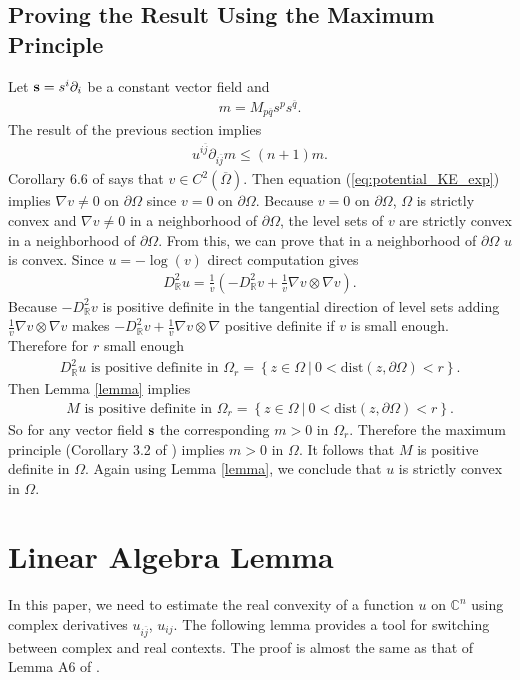 \documentclass{article}
\numberwithin{equation}{section}
\newcommand{\ER}{\mathbb{R}}
\newcommand{\EC}{\mathbb{C}}
\newcommand{\ijbar}{{i\overline j}}
\newcommand{\partialijbar}{\partial_{i\overline j}}
\newcommand{\bfs}{{\bf s}}
\newcommand{\qbar}{{\overline{q}}}
\newcommand{\uijbar}{{u^{\ijbar}}}
\begin{document}
\subsection{Proving the Result Using the Maximum Principle}
\label{sec:Proving_Result_Maximum_Principle}
Let $\bfs=s^i \partial_i$ be a constant vector field and 
\begin{align}
	m=M_{p\qbar}s^p s^{\qbar}.
\end{align}
The result of the previous section implies
\begin{align}
	\uijbar\partialijbar m\leq (n+1)m.
\end{align}
Corollary 6.6 of \cite{ChengYau_80_KahlerMetric} says that $v\in C^2(\overline{\Omega})$. Then equation (\ref{eq:potential_KE_exp}) implies $\nabla v\neq 0$  on $\partial\Omega$ since $v=0$ on $\partial\Omega$. Because $v=0$ on $\partial\Omega$, $\Omega$ is strictly convex and $\nabla v\neq0$ in a neighborhood of $\partial\Omega$, the level sets of $v$ are strictly convex in a neighborhood of $\partial\Omega$. From this, we can prove that in a neighborhood of $\partial \Omega$ $u$ is convex. Since $u=-\log(v)$ direct computation gives
\begin{align}
  D^2_{\ER}u=\frac{1}{v}	\left(-D^2_{\ER}v+\frac{1}{v}\nabla v\otimes\nabla v\right).
\end{align}
Because $-D^2_{\ER}v$ is positive definite in the tangential direction of level sets adding $\frac{1}{v}\nabla v\otimes\nabla v$ makes $-D^2_{\ER}v+\frac{1}{v}\nabla v\otimes\nabla $ positive definite if $v$ is small enough. Therefore for $r$ small enough
\begin{align}
	D_{\ER}^2u   \text{\ is positive definite  in \ \ \ \ } \Omega_r=\left\{
	z\in \Omega\ |\ 0<\text{dist}(z,\partial \Omega)<r
	\right\}.
\end{align} 
Then Lemma \ref{lemma} implies 
\begin{align}
	M   \text{\ is positive definite  in \ \ \ \ } \Omega_r=\left\{
	z\in \Omega\ |\ 0<\text{dist}(z,\partial \Omega)<r
	\right\}.
\end{align} 
So for any vector field $\bfs$ the corresponding $m>0$ in $\Omega_r$. Therefore the maximum principle (Corollary 3.2 of \cite{GT}) implies $m>0$ in $\Omega$. It follows that $M$ is positive definite in $\Omega$. Again using Lemma \ref{lemma}, we conclude that  $u$ is strictly convex in $\Omega$.

\appendix
\section{Linear Algebra Lemma}
In this paper, we need to estimate the real convexity of a function $u$ on $\EC^n$ using complex derivatives $u_{\ijbar}$, $u_{ij}$. The following lemma provides a tool for switching between complex and real contexts. The proof is almost the same as that of Lemma A6 of \cite{Hu22Nov}.
\end{document}
